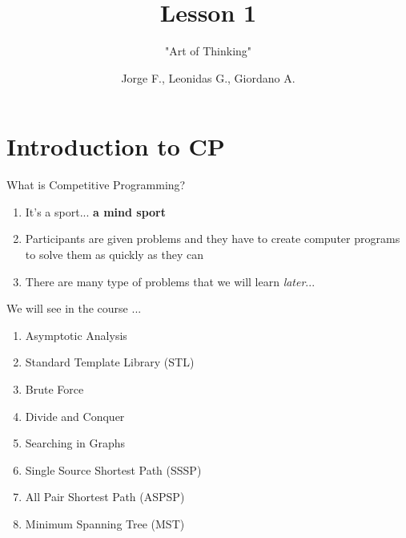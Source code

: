 \documentclass{beamer}
\author{Jorge F., Leonidas G., Giordano A.}
\title{Lesson 1}
\subtitle{"Art of Thinking"}
\institute{UTEC}
\date{}
\begin{document}
\begin{frame}
  \titlepage
\end{frame}


\section{Introduction to CP}

\begin{frame}{What is Competitive Programming?}
  \begin{enumerate}
    \item It's a sport... \textbf{a mind sport}
    \item Participants are given problems and they have to create computer programs to solve them as quickly as they can
    \item There are many type of problems that we will learn \textit{later}...
  \end{enumerate}
\end{frame}

\begin{frame}{We will see in the course ...}
  \begin{enumerate}
    \item Asymptotic Analysis
    \item Standard Template Library (STL)
    \item Brute Force
    \item Divide and Conquer
    \item Searching in Graphs
    \item Single Source Shortest Path (SSSP)
    \item All Pair Shortest Path (ASPSP)
    \item Minimum Spanning Tree (MST)
  \end{enumerate}
\end{frame}
\end{document}
